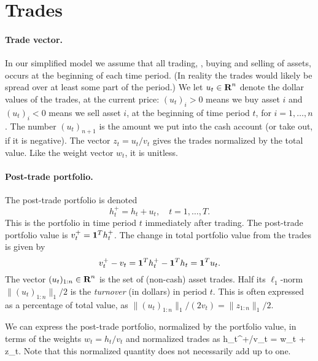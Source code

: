 \documentclass[openany]{article}  %
\begin{document}
\section{Trades}
\paragraph{Trade vector.}
In our simplified model we assume that all trading, \ie,
buying and selling of assets, occurs at the beginning of each time period.
(In reality the trades would likely be spread over at least some part of the period.)
We let $u_t \in {\mbox{\bf R}}^n$ denote the dollar values of the
trades, at the current price: $(u_t)_i>0$ means we buy
asset $i$ and $(u_t)_i<0$ means we sell
asset $i$, at the beginning of time period $t$, for $i=1, \ldots, n$.
The number $(u_t)_{n+1}$ is the amount we put into the cash account (or take out,
if it is negative).
The vector $z_t = u_t/v_t$ gives the trades normalized by the total value.
Like the weight vector $w_t$, it is unitless.

\paragraph{Post-trade portfolio.}
The post-trade portfolio is denoted
\[
h_t^+ = h_t + u_t, \quad t=1,\ldots, T.
\]
This is the portfolio in time period $t$ immediately after trading.
The post-trade portfolio value is $v_t^+ = \mathbf 1^T h_t^+$.
The change in total portfolio value from the trades is given by
\[
v_t ^+ - v_t = \mathbf 1^T h_t^+ - \mathbf 1^T h_t = \mathbf 1^T u_t.
\]
The vector $(u_t)_{1:n}\in {\mbox{\bf R}}^n$ is the set of (non-cash) asset trades.
Half its $\ell_1$-norm $\|(u_t)_{1:n}\|_1/2$ is the \emph{turnover}
(in dollars) in period $t$.
This is often expressed as a percentage of total value, as
$\|(u_t)_{1:n}\|_1/(2v_t) = \|z_{1:n}\|_1/2$.

We can express the post-trade portfolio, normalized by the portfolio
value, in terms of the weights $w_t=h_t/v_t$ and normalized trades as
\BEQ\label{e-wt+}
h_t^+/v_t = w_t + z_t.
\EEQ
Note that this normalized quantity does not necessarily add up to one.
\end{document}
